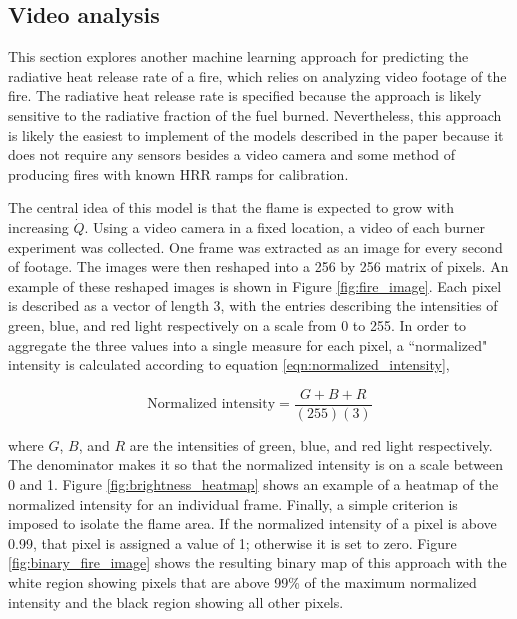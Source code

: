 \documentclass{article}
\begin{document}
\clearpage
\subsection{Video analysis}
This section explores another machine learning approach for predicting the radiative heat release rate of a fire, which relies on analyzing video footage of the fire. The radiative heat release rate is specified because the approach is likely sensitive to the radiative fraction of the fuel burned. Nevertheless, this approach is likely the easiest to implement of the models described in the paper because it does not require any sensors besides a video camera and some method of producing fires with known HRR ramps for calibration. 

The central idea of this model is that the flame is expected to grow with increasing $\dot{Q}$. Using a video camera in a fixed location, a video of each burner experiment was collected. One frame was extracted as an image for every second of footage. The images were then reshaped into a 256 by 256 matrix of pixels. An example of these reshaped images is shown in Figure \ref{fig:fire_image}. Each pixel is described as a vector of length 3, with the entries describing the intensities of green, blue, and red light respectively on a scale from 0 to 255. In order to aggregate the three values into a single measure for each pixel, a ``normalized" intensity is calculated according to equation \ref{eqn:normalized_intensity},  

\begin{equation}
  \label{eqn:normalized_intensity}
 \text{Normalized intensity} = \frac{G + B + R}{(255)(3)}
\end{equation}

\noindent where $G$, $B$, and $R$ are the intensities of green, blue, and red light respectively. The denominator makes it so that the normalized intensity is on a scale between 0 and 1. Figure \ref{fig:brightness_heatmap} shows an example of a heatmap of the normalized intensity for an individual frame. Finally, a simple criterion is imposed to isolate the flame area. If the normalized intensity of a pixel is above 0.99, that pixel is assigned a value of 1; otherwise it is set to zero. Figure \ref{fig:binary_fire_image} shows the resulting binary map of this approach with the white region showing pixels that are above 99\% of the maximum normalized intensity and the black region showing all other pixels. 
\end{document}
